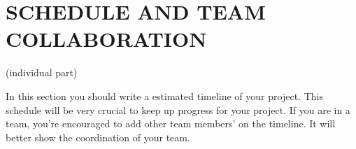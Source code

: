 \documentclass[letterpaper, 10 pt, conference]{ieeeconf}  %
\begin{document}
\section{SCHEDULE AND TEAM COLLABORATION}

(individual part)

In this section you should write a estimated timeline of your project. This schedule will be very crucial to keep up progress for your project. If you are in a team, you're encouraged to add other team members' on the timeline. It will better show the coordination of your team.
   

\addtolength{\textheight}{-12cm}   %



\end{document}
